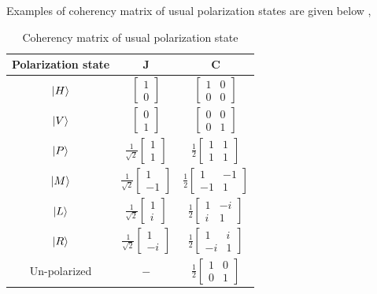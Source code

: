 \documentclass[11pt,a4paper]{article}
\numberwithin{equation}{section}
\begin{document}
Examples of coherency matrix of usual polarization states are given below \cite{coherency},
\begin{table}[H]
	\centering
	\begin{tabular}{ c c c } 
		\hline
		\hline
		Polarization state & $\boldsymbol{J}$ & $\boldsymbol{C}$\\
		\hline
		$\ket{H}$ & $\begin{bmatrix}1\\0\end{bmatrix}$ & $\begin{bmatrix}1&0\\0&0\end{bmatrix}$\\ \hline
		$\ket{V}$ & $\begin{bmatrix}0\\1\end{bmatrix}$ & $\begin{bmatrix}0&0\\0&1\end{bmatrix}$\\ \hline
		$\ket{P}$ & $\frac{1}{\sqrt{2}}\begin{bmatrix}1\\1\end{bmatrix}$ & $\frac{1}{2}\begin{bmatrix}1&1\\1&1\end{bmatrix}$\\ \hline
		$\ket{M}$ & $\frac{1}{\sqrt{2}}\begin{bmatrix}1\\-1\end{bmatrix}$ & $\frac{1}{2}\begin{bmatrix}1&-1\\-1&1\end{bmatrix}$\\ \hline
		$\ket{L}$ & $\frac{1}{\sqrt{2}}\begin{bmatrix}1\\i\end{bmatrix}$ & $\frac{1}{2}\begin{bmatrix}1&-i\\i&1\end{bmatrix}$\\ \hline
		$\ket{R}$ & $\frac{1}{\sqrt{2}}\begin{bmatrix}1\\-i\end{bmatrix}$ & $\frac{1}{2}\begin{bmatrix}1&i\\-i&1\end{bmatrix}$\\ \hline
		Un-polarized & $-$ &  $\frac{1}{2}\begin{bmatrix}1&0\\0&1\end{bmatrix}$\\
		\hline
		\hline
	\end{tabular}
	\caption{Coherency matrix of usual polarization state}
	\label{table:3}
\end{table}
\end{document}
